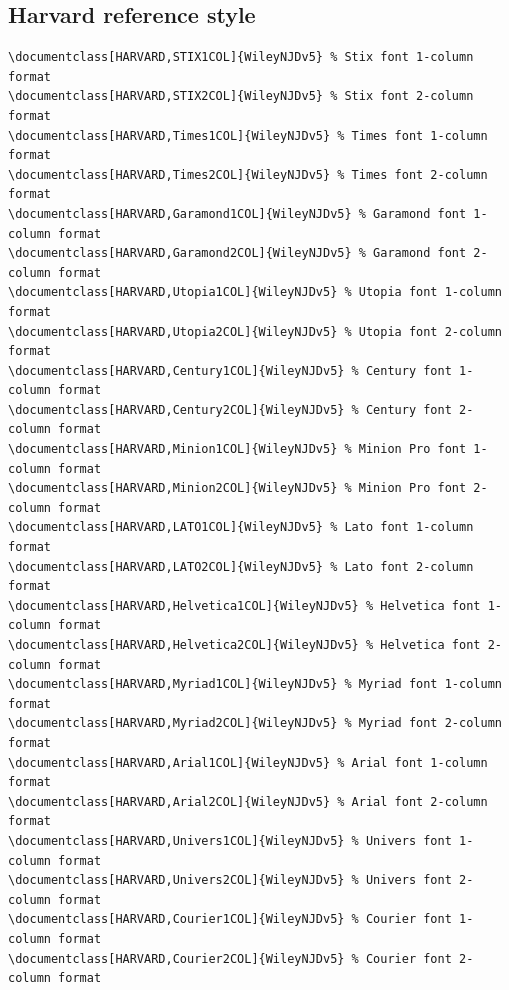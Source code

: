 \documentclass[11pt]{article}
\begin{document}
\subsection*{Harvard reference style}
{\fontsize{9}{10}\selectfont\begin{verbatim}
\documentclass[HARVARD,STIX1COL]{WileyNJDv5} % Stix font 1-column format
\documentclass[HARVARD,STIX2COL]{WileyNJDv5} % Stix font 2-column format
\documentclass[HARVARD,Times1COL]{WileyNJDv5} % Times font 1-column format
\documentclass[HARVARD,Times2COL]{WileyNJDv5} % Times font 2-column format
\documentclass[HARVARD,Garamond1COL]{WileyNJDv5} % Garamond font 1-column format
\documentclass[HARVARD,Garamond2COL]{WileyNJDv5} % Garamond font 2-column format
\documentclass[HARVARD,Utopia1COL]{WileyNJDv5} % Utopia font 1-column format
\documentclass[HARVARD,Utopia2COL]{WileyNJDv5} % Utopia font 2-column format
\documentclass[HARVARD,Century1COL]{WileyNJDv5} % Century font 1-column format
\documentclass[HARVARD,Century2COL]{WileyNJDv5} % Century font 2-column format
\documentclass[HARVARD,Minion1COL]{WileyNJDv5} % Minion Pro font 1-column format
\documentclass[HARVARD,Minion2COL]{WileyNJDv5} % Minion Pro font 2-column format
\documentclass[HARVARD,LATO1COL]{WileyNJDv5} % Lato font 1-column format
\documentclass[HARVARD,LATO2COL]{WileyNJDv5} % Lato font 2-column format
\documentclass[HARVARD,Helvetica1COL]{WileyNJDv5} % Helvetica font 1-column format
\documentclass[HARVARD,Helvetica2COL]{WileyNJDv5} % Helvetica font 2-column format
\documentclass[HARVARD,Myriad1COL]{WileyNJDv5} % Myriad font 1-column format
\documentclass[HARVARD,Myriad2COL]{WileyNJDv5} % Myriad font 2-column format
\documentclass[HARVARD,Arial1COL]{WileyNJDv5} % Arial font 1-column format
\documentclass[HARVARD,Arial2COL]{WileyNJDv5} % Arial font 2-column format
\documentclass[HARVARD,Univers1COL]{WileyNJDv5} % Univers font 1-column format
\documentclass[HARVARD,Univers2COL]{WileyNJDv5} % Univers font 2-column format
\documentclass[HARVARD,Courier1COL]{WileyNJDv5} % Courier font 1-column format
\documentclass[HARVARD,Courier2COL]{WileyNJDv5} % Courier font 2-column format
\end{verbatim}}
\end{document}
